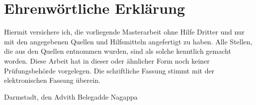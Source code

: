 \documentclass[longdoc,accentcolor=tud4b,12pt,paper=a4,colorback=tud4b,oneside]{tudreport}
\title{\komTitle}
\subtitle{\komThesisType}
\newcounter{dummy} %
\newcommand{\komThesisType}{Masterarbeit\xspace} %
\newcommand{\komName}{Advith Belegadde Nagappa\xspace}
\newcommand{\komSubmissionDate}{\xspace}%
\begin{document}
	\frenchspacing
	\raggedbottom
	\maketitle
	\chapter*{Ehrenw\"ortliche Erkl\"arung}
	Hiermit versichere ich, die vorliegende \komThesisType ohne Hilfe Dritter und nur mit den angegebenen Quellen
    und Hilfsmitteln angefertigt zu haben. Alle Stellen, die aus den Quellen entnommen wurden, sind als solche
    kenntlich gemacht worden. Diese Arbeit hat in dieser oder \"ahnlicher Form noch keiner Pr\"ufungsbeh\"orde vorgelegen.
    Die schriftliche Fassung stimmt mit der elektronischen Fassung \"uberein.
	\vspace{1.5cm}
	
	\noindent Darmstadt, den \komSubmissionDate\hfill \komName
	\pagebreak
	
	\tableofcontents
	\listoffigures
	\listoftables
	\pagebreak
	
	\printacronyms[include-classes=abbrev,name=Abbreviations]
	\cleardoublepage
	
	
	
	
	
	
	

	
	
\end{document}
